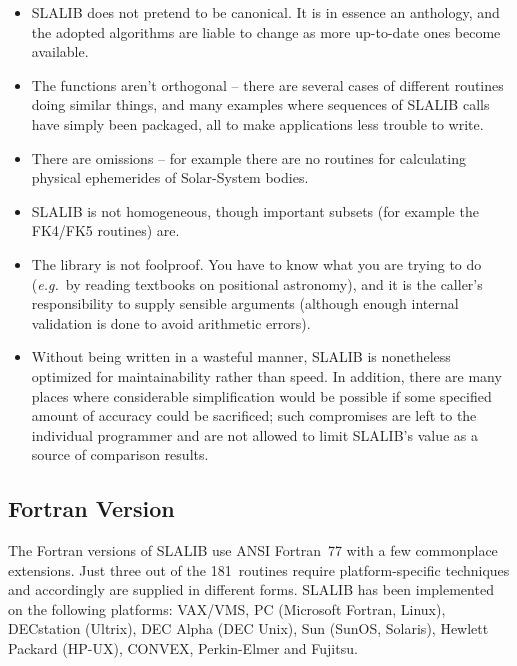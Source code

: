 \documentclass[11pt,twoside]{article}
\newcommand{\nroutines} {181}
\begin{document}
\begin{itemize}
\item SLALIB does not pretend to be canonical.  It is in essence
an anthology, and the adopted algorithms are liable
to change as more up-to-date ones become available.
\item The functions aren't orthogonal -- there are several
cases of different
routines doing similar things, and many examples where
sequences of SLALIB calls have simply been packaged, all to
make applications less trouble to write.
\item There are omissions -- for example there are no
routines for calculating physical ephemerides of
Solar-System bodies.
\item SLALIB is not homogeneous, though important subsets
(for example the FK4/FK5 routines) are.
\item The library is not foolproof.  You have to know what
you are trying to do ({\it e.g.}\ by reading textbooks on positional
astronomy), and it is the caller's responsibility to supply
sensible arguments (although enough internal validation is done to
avoid arithmetic errors).
\item Without being written in a wasteful
manner, SLALIB is nonetheless optimized for maintainability
rather than speed.  In addition, there are many places
where considerable simplification would be possible if some
specified amount of accuracy could be sacrificed;  such
compromises are left to the individual programmer and
are not allowed to limit SLALIB's value as a source
of comparison results.
\end{itemize}

\subsection{Fortran Version}
The Fortran versions of SLALIB use ANSI Fortran~77 with a few
commonplace extensions.  Just three out of the \nroutines\ routines require
platform-specific techniques and accordingly are supplied
in different forms.
SLALIB has been implemented on the following platforms:
VAX/VMS,
PC (Microsoft Fortran, Linux),
DECstation (Ultrix),
DEC Alpha (DEC Unix),
Sun (SunOS, Solaris),
Hewlett Packard (HP-UX),
CONVEX,
Perkin-Elmer and
Fujitsu.
\end{document}
